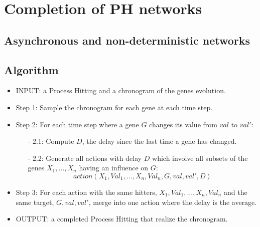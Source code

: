 
\section{Completion of PH networks}

\subsection{ Asynchronous and non-deterministic networks}

\subsection{Algorithm}

\begin{itemize}
	\item INPUT:  a Process Hitting and a chronogram of the genes evolution.%

	\item Step 1: Sample the chronogram for each gene at each time step.

	\item Step 2: For each time step where a gene $G$ changes its value from $val$ to $val'$:

	\begin{itemize}
		\item[-] 2.1: Compute $D$, the delay since the last time a gene has changed.
		\item[-] 2.2: Generate all actions with delay $D$ which involve all subsets of the genes $X_1, \ldots, X_n$ having an influence on $G$:
		$$action(X_1,Val_1,\ldots, X_n,Val_n, G, val, val', D)$$
	\end{itemize}

	\item Step 3: For each action with the same hitters, $X_1,Val_1,\ldots, X_n,Val_n$ and the same target, $G, val, val'$, merge into one action where the delay is the average.
	\item OUTPUT:  a completed Process Hitting that realize the chronogram.

\end{itemize}



